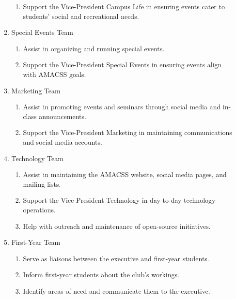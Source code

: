 \documentclass[12pt,a4paper]{article}
\begin{document}
\begin{enumerate}
\begin{enumerate}
\begin{enumerate}
\item Support the Vice-President Campus Life in ensuring events cater to students' social and recreational needs.
\end{enumerate}

\item Special Events Team

\begin{enumerate}
\item Assist in organizing and running special events.

\item Support the Vice-President Special Events in ensuring events align with AMACSS goals.
\end{enumerate}

\item Marketing Team

\begin{enumerate}
\item Assist in promoting events and seminars through social media and in-class announcements.

\item Support the Vice-President Marketing in maintaining communications and social media accounts.
\end{enumerate}

\item Technology Team

\begin{enumerate}
\item Assist in maintaining the AMACSS website, social media pages, and mailing lists.

\item Support the Vice-President Technology in day-to-day technology operations.

\item Help with outreach and maintenance of open-source initiatives.
\end{enumerate}

\item First-Year Team

\begin{enumerate}
\item Serve as liaisons between the executive and first-year students.

\item Inform first-year students about the club's workings.

\item Identify areas of need and communicate them to the executive.
\end{enumerate}


\end{enumerate}
\end{enumerate}
\end{document}
